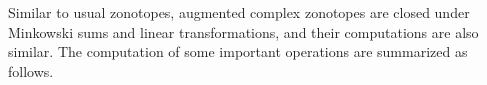 

Similar to usual zonotopes, augmented
complex zonotopes are closed under Minkowski sums and linear
transformations, and their computations are also similar. The computation of some important operations are summarized as follows.

